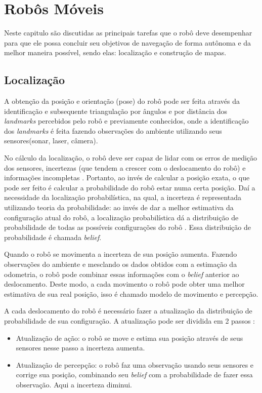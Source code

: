 \chapter{Robôs Móveis}
\label{robosMoveis}

  Neste capitulo são discutidas as principais tarefas que o robô deve desempenhar
  para que ele possa concluir seu objetivos de navegação de forma autônoma e da melhor maneira possível, sendo elas: localização e construção de mapas.
  
\section{Localização}
A obtenção da posição e orientação (pose) do robô pode ser feita através da identificação e 
subsequente triangulação por ângulos e por distância dos \textit{landmarks} percebidos pelo robô e
 previamente conhecidos, onde a identificação dos \textit{landmarks} 
 é feita fazendo observações do ambiente utilizando seus sensores(sonar, laser, câmera).
 
 No cálculo da localização, o robô deve ser capaz de lidar com os erros de medição dos sensores, 
 incertezas (que tendem a crescer com o deslocamento do robô) 
 e informações incompletas \cite{localization1}.  Portanto, ao invés de calcular a posição exata, 
 o que pode ser feito é calcular a probabilidade do robô estar numa certa posição. Daí a necessidade da 
 localização probabilística, na qual, a incerteza é representada utilizando teoria da probabilidade: 
 ao invés de dar a melhor estimativa da configuração atual do robô, 
 a localização probabilística dá a distribuição de probabilidade de todas as possíveis 
 configurações do robô \cite{localization1}. Essa distribuição de probabilidade é chamada \textit{belief}.
 
 Quando o robô se movimenta a incerteza de sua posição aumenta. 
 Fazendo observações do ambiente e mesclando os dados obtidos com a estimação da odometria, 
 o robô pode combinar essas informações com o \textit{belief} anterior ao deslocamento. 
 Deste modo, a cada movimento o robô pode
 obter uma melhor estimativa de sua real posição, isso é chamado modelo de movimento e percepção.
 
 A cada deslocamento do robô é necessário fazer a atualização da distribuição de probabilidade de sua configuração. 
 A atualização pode ser dividida em 2 passos \cite{localization1}:
 \begin{itemize}
  \item Atualização de ação: o robô se move e estima sua posição através de seus sensores nesse passo a incerteza aumenta.
  \item Atualização de percepção: o robô faz uma observação usando seus sensores e corrige sua posição, 
  combinando seu \textit{belief} com a probabilidade de fazer essa observação.
  Aqui a incerteza diminui.
 \end{itemize}

